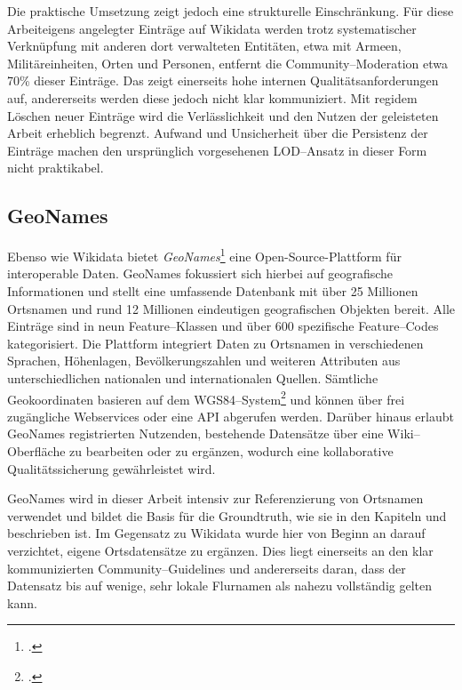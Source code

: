 \documentclass[12pt, a4paper, ngerman, bidi=default]{article}
\let\cite\footcite
\begin{document}
Die praktische Umsetzung zeigt jedoch eine strukturelle Einschränkung. Für diese Arbeiteigens angelegter Einträge auf Wikidata werden
trotz systematischer Verknüpfung mit anderen dort verwalteten Entitäten, etwa mit Armeen, Militäreinheiten, Orten und Personen, entfernt die Community–Moderation etwa 70\% dieser Einträge. 
Das zeigt einerseits hohe internen Qualitätsanforderungen auf, andererseits werden diese jedoch nicht klar kommuniziert. Mit regidem Löschen neuer Einträge wird die Verlässlichkeit und den Nutzen der 
geleisteten Arbeit erheblich begrenzt. 
Aufwand und Unsicherheit über die Persistenz der Einträge machen den ursprünglich vorgesehenen LOD–Ansatz in dieser Form nicht praktikabel.

\subsection{GeoNames}\label{subsec:geonames}

Ebenso wie Wikidata bietet \textit{GeoNames}\cite[vgl.][]{noauthor_geonames_nodate} eine Open-Source-Plattform für interoperable Daten. GeoNames fokussiert sich hierbei auf geografische Informationen 
und stellt eine umfassende Datenbank mit über 25 Millionen Ortsnamen und rund 12 Millionen eindeutigen geografischen Objekten bereit.  
Alle Einträge sind in neun Feature–Klassen und über 600 spezifische Feature–Codes kategorisiert. Die Plattform integriert Daten zu 
Ortsnamen in verschiedenen Sprachen, Höhenlagen, Bevölkerungszahlen und weiteren Attributen aus unterschiedlichen nationalen und internationalen Quellen.  
Sämtliche Geokoordinaten basieren auf dem WGS84–System\cite[\textit{WGS84: geodätische Grundlage des Global Positioning System (GPS)} ;vgl.][]{noauthor_wgs84_nodate}
und können über frei zugängliche Webservices oder eine API abgerufen werden.  
Darüber hinaus erlaubt GeoNames registrierten Nutzenden, bestehende Datensätze über eine Wiki–Oberfläche zu bearbeiten oder zu ergänzen, wodurch eine 
kollaborative Qualitätssicherung gewährleistet wird.

GeoNames wird in dieser Arbeit intensiv zur Referenzierung von Ortsnamen verwendet und bildet die Basis für die Groundtruth, wie sie in den Kapiteln  und 
 beschrieben ist. Im Gegensatz zu Wikidata wurde hier von Beginn an darauf verzichtet, eigene Ortsdatensätze zu ergänzen. Dies liegt einerseits an 
den klar kommunizierten Community–Guidelines und andererseits daran, dass der Datensatz bis auf wenige, sehr lokale Flurnamen als nahezu vollständig gelten kann.
\end{document}
